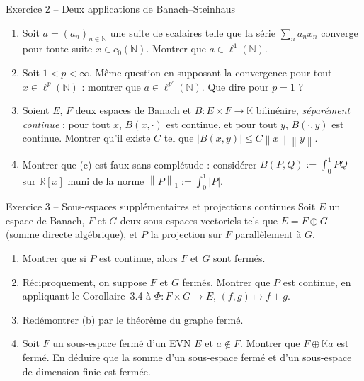 \documentclass[11pt,a4paper]{article}
\newcommand{\R}{\mathbb{R}}
\newcommand{\N}{\mathbb{N}}
\newcommand{\K}{\mathbb{K}}
\newcommand{\norm}[1]{\left\|#1\right\|}
\theoremstyle{definition}
\begin{document}
\begin{exo}{Exercice 2 -- Deux applications de Banach--Steinhaus}
\begin{enumerate}[label=(\alph*)]
  \item Soit $a=(a_n)_{n\in\N}$ une suite de scalaires telle que la série $\sum_na_nx_n$ converge pour toute suite $x\in c_0(\N)$. Montrer que $a\in\ell^1(\N)$.
  \item Soit $1<p<\infty$. Même question en supposant la convergence pour tout $x\in\ell^p(\N)$ : montrer que $a\in\ell^{p'}(\N)$. Que dire pour $p=1$ ?
  \item Soient $E$, $F$ deux espaces de Banach et $B:E\times F\to\K$ bilinéaire, \emph{séparément continue} : pour tout $x$, $B(x,\cdot)$ est continue, et pour tout $y$, $B(\cdot,y)$ est continue. Montrer qu'il existe $C$ tel que $|B(x,y)|\le C\norm x\norm y$.
  \item Montrer que (c) est faux sans complétude : considérer $B(P,Q):=\int_0^1PQ$ sur $\R[x]$ muni de la norme $\norm P_1:=\int_0^1|P|$.
\end{enumerate}
\end{exo}

\begin{exo}{Exercice 3 -- Sous-espaces supplémentaires et projections continues}
Soit $E$ un espace de Banach, $F$ et $G$ deux sous-espaces vectoriels tels que $E=F\oplus G$ (somme directe algébrique), et $P$ la projection sur $F$ parallèlement à $G$.
\begin{enumerate}[label=(\alph*)]
  \item Montrer que si $P$ est continue, alors $F$ et $G$ sont fermés.
  \item Réciproquement, on suppose $F$ et $G$ fermés. Montrer que $P$ est continue, en appliquant le Corollaire~3.4 à $\Phi:F\times G\to E$, $(f,g)\mapsto f+g$.
  \item Redémontrer (b) par le théorème du graphe fermé.
  \item Soit $F$ un sous-espace fermé d'un EVN $E$ et $a\notin F$. Montrer que $F\oplus\K a$ est fermé. En déduire que la somme d'un sous-espace fermé et d'un sous-espace de dimension finie est fermée.
\end{enumerate}
\end{exo}
\end{document}
